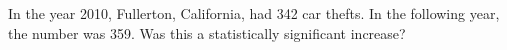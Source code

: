 In the year 2010, Fullerton, California, had 342 car thefts. 
In the following year, the number was 359. Was this a
statistically significant increase?
